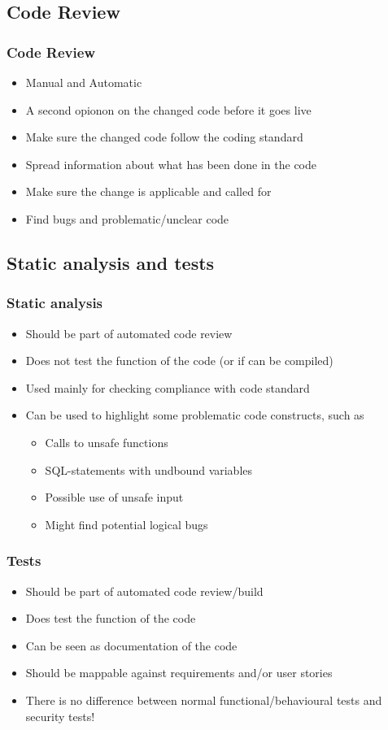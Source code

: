 \documentclass{beamer}
\begin{document}
\begin{frame}

\subsection{Code Review}
\begin{frame}
\frametitle{Code Review}
\begin{itemize}
  \item Manual and Automatic
  \item A second opionon on the changed code before it goes live
  \item Make sure the changed code follow the coding standard
  \item Spread information about what has been done in the code
  \item Make sure the change is applicable and called for
  \item Find bugs and problematic/unclear code
\end{itemize}
\end{frame}

\subsection{Static analysis and tests}
\begin{frame}
\frametitle{Static analysis}
\begin{itemize}
  \item Should be part of automated code review
  \item Does not test the function of the code (or if can be compiled)
  \item Used mainly for checking compliance with code standard
  \item Can be used to highlight some problematic code constructs, such as
  \begin{itemize}
    \item Calls to unsafe functions
    \item SQL-statements with undbound variables
    \item Possible use of unsafe input
    \item Might find potential logical bugs
  \end{itemize}
\end{itemize}
\end{frame}

\begin{frame}
\frametitle{Tests}
\begin{itemize}
  \item Should be part of automated code review/build
  \item Does test the function of the code
  \item Can be seen as documentation of the code
  \item Should be mappable against requirements and/or user stories
  \item There is no difference between normal functional/behavioural tests and security tests!
\end{itemize}
\end{frame}


\end{frame}
\end{document}
